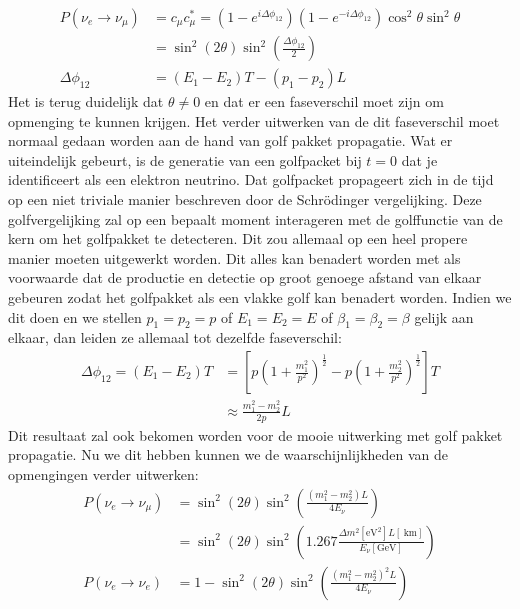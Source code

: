 \documentclass[../main.tex]{subfiles}
\begin{document}
\begin{equation}
    \begin{aligned}
        \label{eq:neutrino_2_oscilaties_5}
        P\left(\nu_{e} \rightarrow \nu_{\mu}\right) &=c_{\mu} c_{\mu}^{*}=\left(1-e^{i \Delta \phi_{12}}\right)\left(1-e^{-i \Delta \phi_{12}}\right) \cos ^{2} \theta \sin ^{2} \theta \\
                                                    &=\sin ^{2}(2 \theta) \sin ^{2}\left(\frac{\Delta \phi_{12}}{2}\right)\\
        \Delta \phi_{12}&=\left(E_{1}-E_{2}\right) T-\left(p_{1}-p_{2}\right) L
    \end{aligned}
\end{equation}
Het is terug duidelijk dat $\theta\neq 0$ en dat er een faseverschil moet zijn om opmenging te kunnen krijgen. Het verder uitwerken van de dit faseverschil moet normaal gedaan worden aan de hand van golf pakket propagatie. Wat er uiteindelijk gebeurt, is de generatie van een golfpacket bij $t=0$ dat je identificeert als een elektron neutrino. Dat golfpacket propageert zich in de tijd op een niet triviale manier beschreven door de Schrödinger vergelijking. Deze golfvergelijking zal op een bepaalt moment interageren met de golffunctie van de kern om het golfpakket te detecteren. Dit zou allemaal op een heel propere manier moeten uitgewerkt worden. Dit alles kan benadert worden met als voorwaarde dat de productie en detectie op groot genoege afstand van elkaar gebeuren zodat het golfpakket als een vlakke golf kan benadert worden. Indien we dit doen en we stellen $p_{1}=p_{2}=p$ of $E_{1}=E_{2}=E$ of $\beta_{1}=\beta_{2}=\beta$ gelijk aan elkaar, dan leiden ze allemaal tot dezelfde faseverschil:
\begin{equation}
    \begin{aligned}
        \label{eq:neutrino_2_oscilaties_6}
        \Delta \phi_{12}=\left(E_{1}-E_{2}\right) T &=\left[p\left(1+\frac{m_{1}^{2}}{p^{2}}\right)^{\frac{1}{2}}-p\left(1+\frac{m_{2}^{2}}{p^{2}}\right)^{\frac{1}{2}}\right] T \\
                                                    & \approx \frac{m_{1}^{2}-m_{2}^{2}}{2 p} L
    \end{aligned}
\end{equation}
Dit resultaat zal ook bekomen worden voor de mooie uitwerking met golf pakket propagatie. Nu we dit hebben kunnen we de waarschijnlijkheden van de opmengingen verder uitwerken:
\begin{equation}
    \begin{aligned}
        \label{eq:neutrino_2_oscilaties_7}
        P\left(\nu_{e} \rightarrow \nu_{\mu}\right) &=\sin ^{2}(2 \theta) \sin ^{2}\left(\frac{\left(m_{1}^{2}-m_{2}^{2}\right) L}{4 E_{\nu}}\right) \\
                                                    &=\sin ^{2}(2 \theta) \sin ^{2}\left(1.267 \frac{\Delta m^{2}\left[\mathrm{eV}^{2}\right] L[\mathrm{~km}]}{E_{\nu}[\mathrm{GeV}]}\right) \\
        P\left(\nu_{e} \rightarrow \nu_{e}\right) &=1-\sin ^{2}(2 \theta) \sin ^{2}\left(\frac{\left(m_{1}^{2}-m_{2}^{2}\right)^{2} L}{4 E_{\nu}}\right)
    \end{aligned}
\end{equation}
\end{document}
